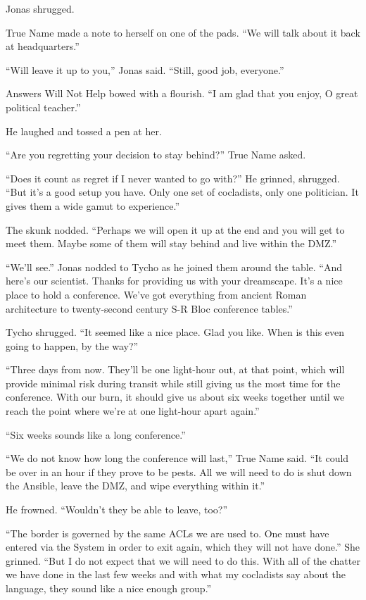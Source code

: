 Jonas shrugged.

True Name made a note to herself on one of the pads. ``We will talk about it back at headquarters.''

``Will leave it up to you,'' Jonas said. ``Still, good job, everyone.''

Answers Will Not Help bowed with a flourish. ``I am glad that you enjoy, O great political teacher.''

He laughed and tossed a pen at her.

``Are you regretting your decision to stay behind?'' True Name asked.

``Does it count as regret if I never wanted to go with?'' He grinned, shrugged. ``But it's a good setup you have. Only one set of cocladists, only one politician. It gives them a wide gamut to experience.''

The skunk nodded. ``Perhaps we will open it up at the end and you will get to meet them. Maybe some of them will stay behind and live within the DMZ.''

``We'll see.'' Jonas nodded to Tycho as he joined them around the table. ``And here's our scientist. Thanks for providing us with your dreamscape. It's a nice place to hold a conference. We've got everything from ancient Roman architecture to twenty-second century S-R Bloc conference tables.''

Tycho shrugged. ``It seemed like a nice place. Glad you like. When is this even going to happen, by the way?''

``Three days from now. They'll be one light-hour out, at that point, which will provide minimal risk during transit while still giving us the most time for the conference. With our burn, it should give us about six weeks together until we reach the point where we're at one light-hour apart again.''

``Six weeks sounds like a long conference.''

``We do not know how long the conference will last,'' True Name said. ``It could be over in an hour if they prove to be pests. All we will need to do is shut down the Ansible, leave the DMZ, and wipe everything within it.''

He frowned. ``Wouldn't they be able to leave, too?''

``The border is governed by the same ACLs we are used to. One must have entered via the System in order to exit again, which they will not have done.'' She grinned. ``But I do not expect that we will need to do this. With all of the chatter we have done in the last few weeks and with what my cocladists say about the language, they sound like a nice enough group.''

